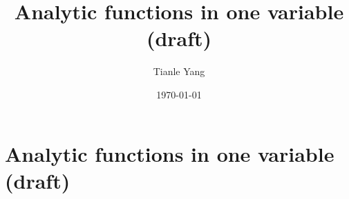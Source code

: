 \documentclass{noteformyself}
\title{Analytic functions in one variable (draft)}
\author{Tianle Yang}
\date{\today}
\begin{document}
    \maketitle

    \section{Analytic functions in one variable (draft)}



\end{document}
